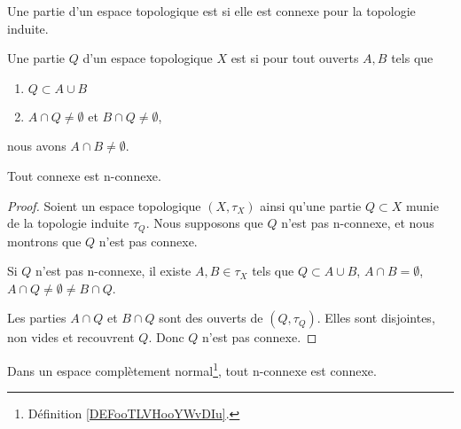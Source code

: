 \begin{definition}	\label{DEFooQGESooKSVtmt}
	Une partie d'un espace topologique est  si elle est connexe pour la topologie induite.
\end{definition}

\begin{definition}	\label{DEFooJYCDooGNEDoC}
	Une partie \( Q\) d'un espace topologique \( X\) est  si pour tout ouverts \( A,B\) tels que
	\begin{enumerate}
		\item
		      \( Q\subset A\cup B\)
		\item
		      \( A\cap Q\neq\emptyset\) et \( B\cap Q\neq \emptyset\),
	\end{enumerate}
	nous avons \( A\cap B\neq \emptyset\).
\end{definition}


\begin{proposition}	\label{PROPooQHJXooMNrxOJ}
	Tout connexe est n-connexe.
\end{proposition}

\begin{proof}
	Soient un espace topologique \( (X,\tau_X)\) ainsi qu'une partie \( Q\subset X\) munie de la topologie induite \( \tau_Q\). Nous supposons que \( Q\) n'est pas n-connexe, et nous montrons que \( Q\) n'est pas connexe.

	Si \( Q\) n'est pas n-connexe, il existe \( A,B\in \tau_X\) tels que \(  Q\subset A\cup B\), \( A\cap B=\emptyset\), \( A\cap Q\neq\emptyset\neq B\cap Q\).

	Les parties \( A\cap Q\) et \( B\cap Q\) sont des ouverts de \( (Q,\tau_Q)\). Elles sont disjointes, non vides et recouvrent \( Q\). Donc \( Q\) n'est pas connexe.
\end{proof}

\begin{proposition}	\label{PROPooAHWNooXhrqnd}
	Dans un espace complètement normal\footnote{Définition \ref{DEFooTLVHooYWvDIu}.}, tout n-connexe est connexe.
\end{proposition}

